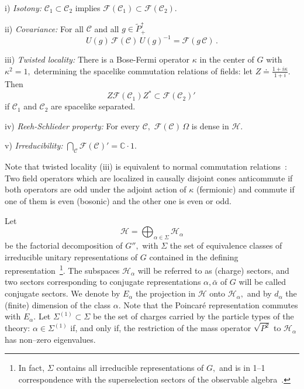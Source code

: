 \documentclass[a4paper,reqno,11pt]{amsart}
\theoremstyle{plain}
\theoremstyle{definition}
\numberwithin{equation}{section}
\newcommand{\Bc}{\mathbb{C}}
\newcommand{\F}{{\mathcal F}}
\newcommand{\calH}{{\mathcal H}}
\newcommand{\calC}{{\mathcal C}}
\newcommand{\Potild}{\tilde{P}_+^{\uparrow}}
\newcommand{\unity}{1}
\newcommand{\Sec}{\Sigma} %
\renewcommand{\sec}{\alpha}
\newcommand{\Sece}{\Sec^{(1)}} %
\newcommand{\Hsec}{\calH_{\sec}}
\newcommand{\Esec}{E_{\sec}}
\newcommand{\cone}{\calC}   %
\begin{document}
 i) {\em Isotony:} $\cone_1\subset \cone_2$ implies 
 $\F(\cone_1)\subset \F(\cone_2).$  

 ii) {\em Covariance:} For all  $\cone$ and all $g\in\Potild$ 
\begin{equation*} %
  U(g)\,\F(\cone)\,U(g)^{-1}=\F(g\,\cone) \,.  
\end{equation*}

 iii) {\em Twisted locality:} 
There is a Bose-Fermi operator $\kappa$ in the center of $G$ %
with $\kappa^2=1,$ determining the spacelike commutation relations of fields: 
let $ Z\doteq\frac{1+i\kappa}{1+i}.$ Then 
\begin{equation*} %
 Z\F(\cone_1)Z^* \subset \F(\cone_2)'\, 
\end{equation*}
if $\cone_1$ and $\cone_2$ are spacelike separated. 

 iv) {\em Reeh-Schlieder property:} For every $\cone,$ 
 $\F(\cone)\,\Omega$ is dense in $\calH.$ 

 v) {\em Irreducibility:} $\bigcap_\cone \F(\cone)' =\Bc\cdot \unity.$ 

Note that twisted locality (iii) is equivalent to normal commutation
relations~\cite{DHRI}: Two field operators which are localized in
causally disjoint cones anticommute if both operators are odd under
the adjoint action of $\kappa$ (fermionic) and commute if one 
of them is even (bosonic) and the other one is even or odd.  

Let 
\[ \calH = \bigoplus_{\sec\in\Sec} \Hsec
\]
be the factorial decomposition of $G'',$ %
with $\Sec$ the set of equivalence classes of irreducible unitary
representations of $G$ contained in the defining 
representation~\footnote{In fact, $\Sec$ contains all irreducible 
  representations of $G,$ and is in 1--1 correspondence with
  the superselection sectors of the observable algebra~\cite{DHRI}.}.  
The subspaces $\Hsec$ will be referred to as (charge) sectors, and two 
sectors corresponding to conjugate representations $\sec,\bar\sec$ of $G$ 
will be called conjugate sectors. We denote by $\Esec$ the projection
in $\calH$ onto $\Hsec,$ and by $d_\sec$  the (finite) dimension of the class 
$\sec.$ Note that the Poincar\'e representation commutes with $\Esec.$ 
Let $\Sece\subset \Sec$ be the set of charges carried by the 
particle types of the theory: $\sec\in\Sece$ if, and only if, the 
restriction of the mass  operator $\sqrt{P^2}$ to $\Hsec$ 
has non--zero eigenvalues. 
\end{document}
